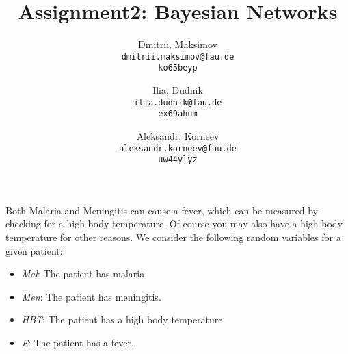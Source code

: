 \documentclass{homework}
\title{Assignment2: Bayesian Networks}
\author{
  Dmitrii, Maksimov\\
  \texttt{dmitrii.maksimov@fau.de} \\
  \texttt{ko65beyp}
  \and
  Ilia, Dudnik\\
  \texttt{ilia.dudnik@fau.de}\\
  \texttt{ex69ahum}
  \and
  Aleksandr, Korneev\\
  \texttt{aleksandr.korneev@fau.de}\\
  \texttt{uw44ylyz}
}
\begin{document}
\maketitle


Both Malaria and Meningitis can cause a fever, which can be measured by
checking for a high body temperature. Of course you may also have a high body temperature for other reasons. We consider the following random variables for a given patient:
\begin{itemize}
	\item \emph{Mal}: The patient has malaria
	\item \emph{Men}: The patient has meningitis.
	\item \emph{HBT}: The patient has a high body temperature.
	\item \emph{F}: The patient has a fever.
\end{itemize}
\end{document}
